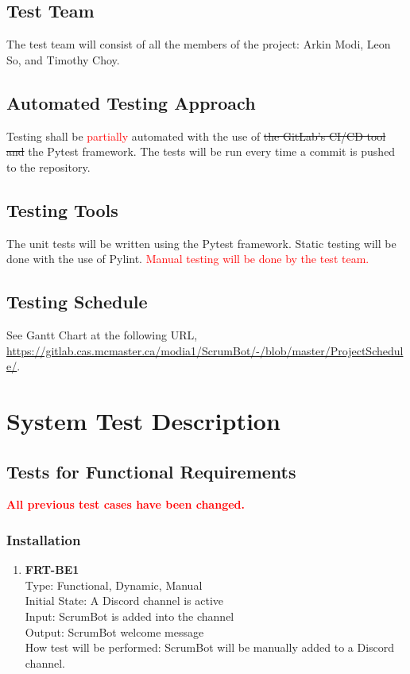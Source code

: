 \documentclass[12pt, titlepage]{article}
\begin{document}
\subsection{Test Team}
The test team will consist of all the members of the project: Arkin Modi, Leon So, and Timothy Choy.

\subsection{Automated Testing Approach}
Testing shall be \textcolor{red}{partially} automated with the use of \sout{the GitLab's CI/CD tool and }the Pytest framework. The tests will be run every time a commit is pushed to the repository.

\subsection{Testing Tools}
The unit tests will be written using the Pytest framework. Static testing will be done with the use of Pylint. \textcolor{red}{Manual testing will be done by the test team.}

\subsection{Testing Schedule}
See Gantt Chart at the following URL, \url{https://gitlab.cas.mcmaster.ca/modia1/ScrumBot/-/blob/master/ProjectSchedule/}.

\section{System Test Description}
\subsection{Tests for Functional Requirements}
\textcolor{red}{\textbf{All previous test cases have been changed.}}

\subsubsection{Installation}
\begin{enumerate}
    \item{\textbf{FRT-BE1}}\\
    Type: Functional, Dynamic, Manual\\
    Initial State: A Discord channel is active\\
    Input: ScrumBot is added into the channel\\
    Output: ScrumBot welcome message\\
    How test will be performed: ScrumBot will be manually added to a Discord channel.\\
\end{enumerate}
\end{document}
